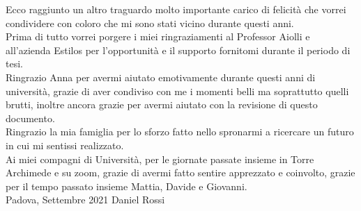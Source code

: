 

Ecco raggiunto un altro traguardo molto importante carico di felicità che vorrei condividere con coloro che mi sono stati vicino durante questi anni.\\
\newline
Prima di tutto vorrei porgere i miei ringraziamenti al Professor Aiolli e all'azienda Estilos per l'opportunità e il supporto fornitomi durante il periodo di tesi.\\
\newline
Ringrazio Anna per avermi aiutato emotivamente durante questi anni di università, grazie di aver condiviso con me i momenti belli ma soprattutto quelli brutti, inoltre ancora grazie per avermi aiutato con la revisione di questo documento.\\
\newline
Ringrazio la mia famiglia per lo sforzo fatto nello spronarmi a ricercare un futuro in cui mi sentissi realizzato.\\
\newline
Ai miei compagni di Università, per le giornate passate insieme in Torre Archimede e su zoom, grazie di avermi fatto sentire apprezzato e coinvolto, grazie per il tempo passato insieme Mattia, Davide e Giovanni.\\
\newline
Padova, Settembre 2021 \hfill Daniel Rossi
